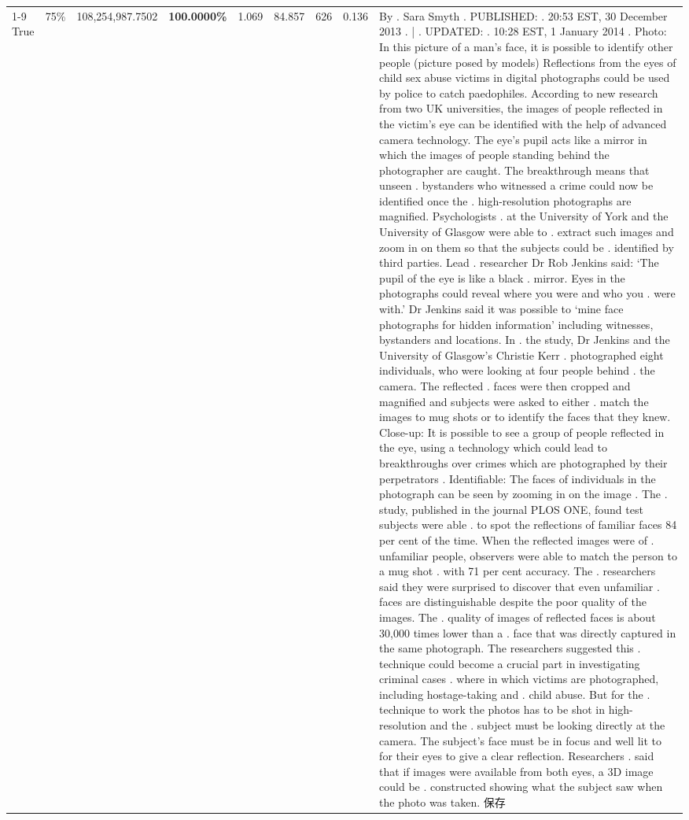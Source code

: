 \begin{table}[H]
\begin{tabular}{lllrlllll}
\cline{1-9} \cline{2-9}
True & 75\% & 108,254,987.7502 & \bfseries \color{red} 100.0000\% & 1.069 & 84.857 & 626 & 0.136 & By . Sara Smyth . PUBLISHED: . 20:53 EST, 30 December 2013 . | . UPDATED: . 10:28 EST, 1 January 2014 . Photo: In this picture of a man's face, it is possible to identify other people (picture posed by models) Reflections from the eyes of child sex abuse victims in digital photographs could be used by police to catch paedophiles. According to new research from two UK universities, the images of people reflected in the victim's eye can be identified with the help of advanced camera technology. The eye's pupil acts like a mirror in which the images of people standing behind the photographer are caught. The breakthrough means that unseen . bystanders who witnessed a crime could now be identified once the . high-resolution photographs are magnified. Psychologists . at the University of York and the University of Glasgow were able to . extract such images and zoom in on them so that the subjects could be . identified by third parties. Lead . researcher Dr Rob Jenkins said: ‘The pupil of the eye is like a black . mirror. Eyes in the photographs could reveal where you were and who you . were with.' Dr Jenkins said it was possible to ‘mine face photographs for hidden information' including witnesses, bystanders and locations. In . the study, Dr Jenkins and the University of Glasgow's Christie Kerr . photographed eight individuals, who were looking at four people behind . the camera. The reflected . faces were then cropped and magnified and subjects were asked to either . match the images to mug shots or to identify the faces that they knew. Close-up: It is possible to see a group of people reflected in the eye, using a technology which could lead to breakthroughs over crimes which are photographed by their perpetrators . Identifiable: The faces of individuals in the photograph can be seen by zooming in on the image . The . study, published in the journal PLOS ONE, found test subjects were able . to spot the reflections of familiar faces 84 per cent of the time. When the reflected images were of . unfamiliar people, observers were able to match the person to a mug shot . with 71 per cent accuracy. The . researchers said they were surprised to discover that even unfamiliar . faces are distinguishable despite the poor quality of the images. The . quality of images of reflected faces is about 30,000 times lower than a . face that was directly captured in the same photograph. The researchers suggested this . technique could become a crucial part in investigating criminal cases . where in which victims are photographed, including hostage-taking and . child abuse. But for the . technique to work the photos has to be shot in high-resolution and the . subject must be looking directly at the camera. The subject's face must be in focus and well lit to for their eyes to give a clear reflection. Researchers . said that if images were available from both eyes, a 3D image could be . constructed showing what the subject saw when the photo was taken. 保存 \\

\end{tabular}
\end{table}
